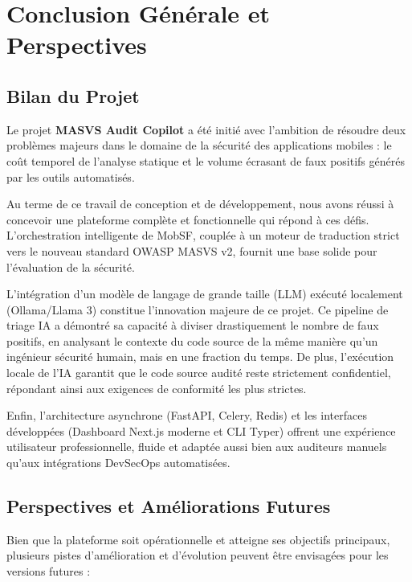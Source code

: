 \chapter{Conclusion Générale et Perspectives}
\label{chap:conclusion}

\section{Bilan du Projet}
Le projet \textbf{MASVS Audit Copilot} a été initié avec l'ambition de résoudre deux problèmes majeurs dans le domaine de la sécurité des applications mobiles : le coût temporel de l'analyse statique et le volume écrasant de faux positifs générés par les outils automatisés.

Au terme de ce travail de conception et de développement, nous avons réussi à concevoir une plateforme complète et fonctionnelle qui répond à ces défis. L'orchestration intelligente de MobSF, couplée à un moteur de traduction strict vers le nouveau standard OWASP MASVS v2, fournit une base solide pour l'évaluation de la sécurité. 

L'intégration d'un modèle de langage de grande taille (LLM) exécuté localement (Ollama/Llama 3) constitue l'innovation majeure de ce projet. Ce pipeline de triage IA a démontré sa capacité à diviser drastiquement le nombre de faux positifs, en analysant le contexte du code source de la même manière qu'un ingénieur sécurité humain, mais en une fraction du temps. De plus, l'exécution locale de l'IA garantit que le code source audité reste strictement confidentiel, répondant ainsi aux exigences de conformité les plus strictes.

Enfin, l'architecture asynchrone (FastAPI, Celery, Redis) et les interfaces développées (Dashboard Next.js moderne et CLI Typer) offrent une expérience utilisateur professionnelle, fluide et adaptée aussi bien aux auditeurs manuels qu'aux intégrations DevSecOps automatisées.

\section{Perspectives et Améliorations Futures}
Bien que la plateforme soit opérationnelle et atteigne ses objectifs principaux, plusieurs pistes d'amélioration et d'évolution peuvent être envisagées pour les versions futures :

